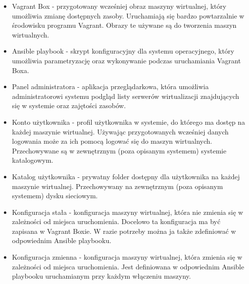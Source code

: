 \documentclass[../wstep.tex]{subfiles}
\begin{document}
\begin{itemize}
    \item Vagrant Box \parencite{vagrantbox} - przygotowany wcześniej obraz maszyny wirtualnej, który umożliwia zmianę dostępnych zasoby. Uruchamiają się bardzo powtarzalnie w środowisku programu Vagrant. Obrazy te używane są do tworzenia maszyn wirtualnych.
    \item Ansible playbook \parencite{ansible-playbook} - skrypt konfiguracyjny dla systemu operacyjnego, który umożliwia parametryzację oraz wykonywanie podczas uruchamiania Vagrant Boxa.
    \item Panel administratora - aplikacja przeglądarkowa, która umożliwia administratorowi systemu podgląd listy serwerów wirtualizacji znajdujących się w systemie oraz zajętości zasobów.
    \item Konto użytkownika - profil użytkownika w systemie, do którego ma dostęp na każdej maszynie wirtualnej. Używając przygotowanych wcześniej danych logowania może za ich pomocą logować się do maszyn wirtualnych. Przechowywane są w zewnętrznym (poza opisanym systemem) systemie katalogowym.
    \item Katalog użytkownika - prywatny folder dostępny dla użytkownika na każdej maszynie wirtualnej. Przechowywany na zewnętrznym (poza opisanym systemem) dysku sieciowym.
    \item Konfiguracja stała - konfiguracja maszyny wirtualnej, która nie zmienia się w zależności od miejsca uruchomienia. Docelowo ta konfiguracja ma być zapisana w Vagrant Boxie. W razie potrzeby można ja także zdefiniować w odpowiednim Ansible playbooku.
    \item Konfiguracja zmienna - konfiguracja maszyny wirtualnej, która zmienia się w zależności od miejsca uruchomienia. Jest definiowana w odpowiednim Ansible playbooku uruchamianym przy każdym włączeniu maszyny.
\end{itemize}
\end{document}
